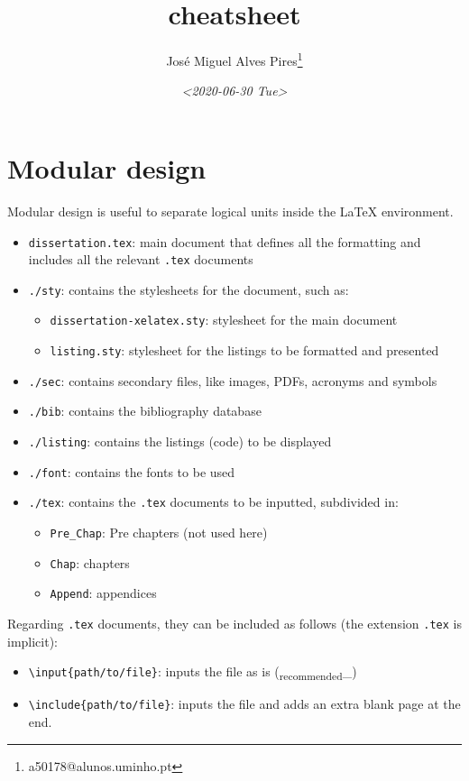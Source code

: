 \documentclass[11pt]{article}
\author{José Miguel Alves Pires\thanks{a50178@alunos.uminho.pt}}
\date{\textit{<2020-06-30 Tue>}}
\title{cheatsheet}
\begin{document}
\maketitle
\tableofcontents


\section{Modular design}
\label{sec:org8053dba}
Modular design is useful to separate logical units inside the \LaTeX{} environment.
\begin{itemize}
\item \texttt{dissertation.tex}: main document that defines all the formatting and includes
all the relevant \texttt{.tex} documents
\item \texttt{./sty}: contains the stylesheets for the document, such as:
\begin{itemize}
\item \texttt{dissertation-xelatex.sty}: stylesheet for the main document
\item \texttt{listing.sty}: stylesheet for the listings to be formatted and presented
\end{itemize}
\item \texttt{./sec}: contains secondary files, like images, PDFs, acronyms and symbols
\item \texttt{./bib}: contains the bibliography database
\item \texttt{./listing}: contains the listings (code) to be displayed
\item \texttt{./font}: contains the fonts to be used
\item \texttt{./tex}: contains the \texttt{.tex} documents to be inputted, subdivided in:
\begin{itemize}
\item \texttt{Pre\_Chap}: Pre chapters (not used here)
\item \texttt{Chap}: chapters
\item \texttt{Append}: appendices
\end{itemize}
\end{itemize}

Regarding \texttt{.tex} documents, they can be included as follows (the extension
\texttt{.tex} is implicit):
\begin{itemize}
\item \texttt{\textbackslash{}input\{path/to/file\}}: inputs the file as is (\textsubscript{recommended}\_)
\item \texttt{\textbackslash{}include\{path/to/file\}}: inputs the file and adds an extra blank page at the
end.
\end{itemize}
\end{document}

